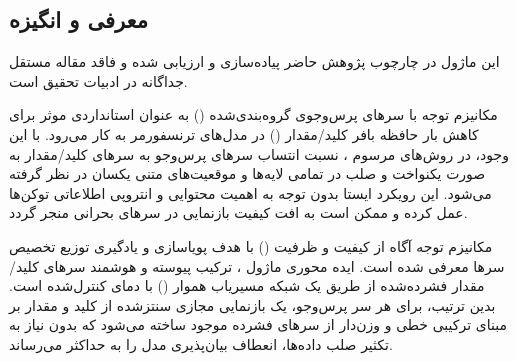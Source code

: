 \subsection{معرفی و انگیزه}
این ماژول در چارچوب پژوهش حاضر پیاده‌سازی و ارزیابی شده و فاقد مقاله مستقل جداگانه در ادبیات تحقیق است.

مکانیزم توجه با سرهای پرس‌وجوی گروه‌بندی‌شده () به عنوان استانداردی موثر برای کاهش بار حافظه بافر کلید/مقدار () در مدل‌های ترنسفورمر به کار می‌رود. با این وجود، در روش‌های مرسوم ، نسبت انتساب سرهای پرس‌وجو به سرهای کلید/مقدار به صورت یکنواخت و صلب در تمامی لایه‌ها و موقعیت‌های متنی یکسان در نظر گرفته می‌شود. این رویکرد ایستا بدون توجه به اهمیت محتوایی و انتروپی اطلاعاتی توکن‌ها عمل کرده و ممکن است به افت کیفیت بازنمایی در سرهای بحرانی منجر گردد.

مکانیزم توجه آگاه از کیفیت و ظرفیت () با هدف پویاسازی و یادگیری توزیع تخصیص سرها معرفی شده است. ایده محوری ماژول ، ترکیب پیوسته و هوشمند سرهای کلید/مقدار فشرده‌شده از طریق یک شبکه مسیریاب هموار () با دمای کنترل‌شده است. بدین ترتیب، برای هر سر پرس‌وجو، یک بازنمایی مجازی سنتز‌شده از کلید و مقدار بر مبنای ترکیبی خطی و وزن‌دار از سرهای فشرده موجود ساخته می‌شود که بدون نیاز به تکثیر صلب داده‌ها، انعطاف بیان‌پذیری مدل را به حداکثر می‌رساند.
